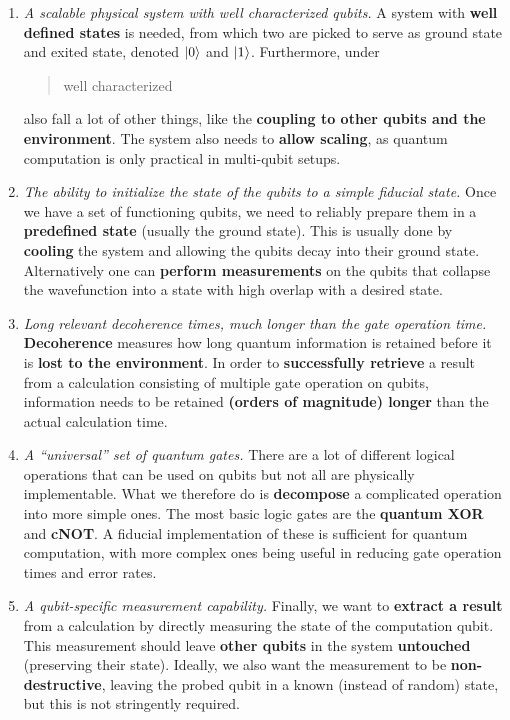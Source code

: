 \documentclass{alex_summary}
\begin{document}
\begin{enumerate}[leftmargin=*]
	\item \textit{A scalable physical system with well characterized qubits.} A system with \textbf{well defined states} is needed, from which two are picked to serve as ground state and exited state, denoted \( \ket{0} \) and \( \ket{1} \). Furthermore, under \blockquote{well characterized} also fall a lot of other things, like the \textbf{coupling to other qubits and the environment}. The system also needs to \textbf{allow scaling}, as quantum computation is only practical in multi-qubit setups.
	\item \textit{The ability to initialize the state of the qubits to a simple fiducial state.} Once we have a set of functioning qubits, we need to reliably prepare them in a \textbf{predefined state} (usually the ground state). This is usually done by \textbf{cooling} the system and allowing the qubits decay into their ground state. Alternatively one can \textbf{perform measurements} on the qubits that collapse the wavefunction into a state with high overlap with a desired state.
	\item \textit{Long relevant decoherence times, much longer than the gate operation time.} \textbf{Decoherence} measures how long quantum information is retained before it is \textbf{lost to the environment}. In order to \textbf{successfully retrieve} a result from a calculation consisting of multiple gate operation on qubits, information needs to be retained \textbf{(orders of magnitude) longer} than the actual calculation time. 
	\item \textit{A “universal” set of quantum gates.} There are a lot of different logical operations that can be used on qubits but not all are physically implementable. What we therefore do is \textbf{decompose} a complicated operation into more simple ones. The most basic logic gates are the \textbf{quantum XOR} and \textbf{cNOT}. A fiducial implementation of these is sufficient for quantum computation, with more complex ones being useful in reducing gate operation times and error rates.
	\item \textit{A qubit-specific measurement capability.} Finally, we want to \textbf{extract a result} from a calculation by directly measuring the state of the computation qubit. This measurement should leave \textbf{other qubits} in the system \textbf{untouched} (preserving their state). Ideally, we also want the measurement to be \textbf{non-destructive}, leaving the probed qubit in a known (instead of random) state, but this is not stringently required.

\end{enumerate}
\end{document}
